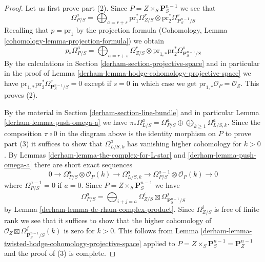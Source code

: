 \begin{proof}

Let us first prove part (2). Since
$P = Z \times_S \mathbf{P}^{n - 1}_S$
we see that
$$
\Omega^a_{P/S} = \bigoplus\nolimits_{a = r + s}
\text{pr}_1^*\Omega^r_{Z/S} \otimes
\text{pr}_2^*\Omega^s_{\mathbf{P}^{n - 1}_S/S}
$$
Recalling that $p = \text{pr}_1$ by the projection formula
(Cohomology, Lemma \ref{cohomology-lemma-projection-formula})
we obtain
$$
p_*\Omega^a_{P/S} = \bigoplus\nolimits_{a = r + s}
\Omega^r_{Z/S} \otimes
\text{pr}_{1, *}\text{pr}_2^*\Omega^s_{\mathbf{P}^{n - 1}_S/S}
$$
By the calculations in Section \ref{derham-section-projective-space}
and in particular in
the proof of Lemma \ref{derham-lemma-hodge-cohomology-projective-space}
we have $\text{pr}_{1, *}\text{pr}_2^*\Omega^s_{\mathbf{P}^{n - 1}_S/S} = 0$
except if $s = 0$ in which case we get
$\text{pr}_{1, *}\mathcal{O}_P = \mathcal{O}_Z$.
This proves (2).

\medskip\noindent
By the material in Section \ref{derham-section-line-bundle} and in particular
Lemma \ref{derham-lemma-push-omega-a} we have
$\pi_*\Omega^a_{L/S} = \Omega^a_{P/S} \oplus
\bigoplus_{k \geq 1} \Omega^a_{L/S, k}$.
Since the composition $\pi \circ 0$ in the diagram above
is the identity morphism on $P$ to prove part (3) it suffices to show that
$\Omega^a_{L/S, k}$ has vanishing higher cohomology for $k > 0$.
By Lemmas \ref{derham-lemma-the-complex-for-L-star} and \ref{derham-lemma-push-omega-a}
there are short exact sequences
$$
0 \to \Omega^a_{P/S} \otimes \mathcal{O}_P(k)
\to \Omega^a_{L/S, k} \to
\Omega^{a - 1}_{P/S} \otimes \mathcal{O}_P(k) \to 0
$$
where $\Omega^{a - 1}_{P/S} = 0$ if $a = 0$. Since
$P = Z \times_S \mathbf{P}^{n - 1}_S$ we have
$$
\Omega^a_{P/S} = \bigoplus\nolimits_{i + j = a}
\Omega^i_{Z/S} \boxtimes \Omega^j_{\mathbf{P}^{n - 1}_S/S}
$$
by Lemma \ref{derham-lemma-de-rham-complex-product}.
Since $\Omega^i_{Z/S}$ is free of finite rank
we see that it suffices to show that the higher cohomology of
$\mathcal{O}_Z \boxtimes \Omega^j_{\mathbf{P}^{n - 1}_S/S}(k)$
is zero for $k > 0$. This follows from
Lemma \ref{derham-lemma-twisted-hodge-cohomology-projective-space}
applied to $P = Z \times_S \mathbf{P}^{n - 1}_S = \mathbf{P}^{n - 1}_Z$
and the proof of (3) is complete.


\end{proof}
